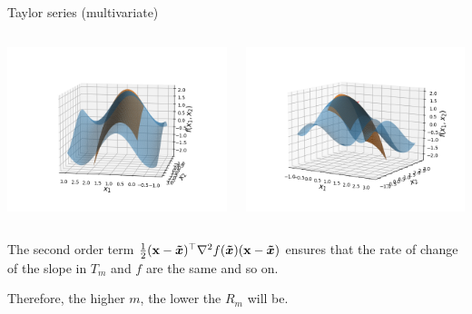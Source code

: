 \begin{vbframe}{Taylor series (multivariate)}
    \framebreak

      \begin{columns}
    \begin{column}{0.48\textwidth}
      \includegraphics[width = \textwidth]{figure_man/Taylor2D/Taylor2D_2nd-100.png}
    \end{column}
    \begin{column}{0.48\textwidth}
      \includegraphics[width = \textwidth]{figure_man/Taylor2D/Taylor2D_2nd-301.png}
    \end{column}
  \end{columns} 

    The second order term $\frac 12(\mathbf{x}-\bm{\tilde{x}})^\top\nabla^2 f(\bm{\tilde{x}})(\mathbf{x}-\bm{\tilde{x}})$ ensures that the rate of change of the slope in $T_{m}$ and $f$ are the same and so on.
    
    \lz
    
    Therefore, the higher $m$, the lower the $R_{m}$ will be.
\end{vbframe}



  \endlecture
